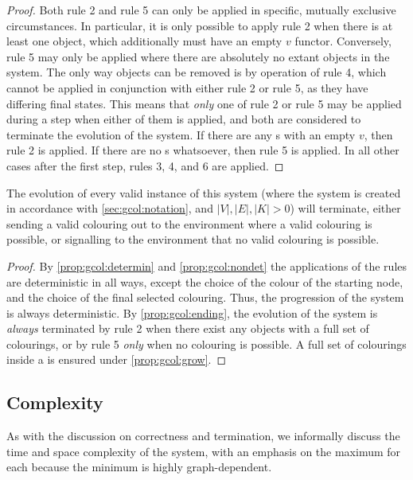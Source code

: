 \begin{proof}
Both rule 2 and rule 5 can only be applied in specific, mutually exclusive circumstances.  In particular, it is only possible to apply rule 2 when there is at least one \bo{} object, which additionally must have an empty \(v\) functor.  Conversely, rule 5 may only be applied where there are absolutely no extant \bo{} objects in the system.  The only way \bo{} objects can be removed is by operation of rule 4, which cannot be applied in conjunction with either rule 2 or rule 5, as they have differing final states.  This means that \emph{only} one of rule 2 or rule 5 may be applied during a step when either of them is applied, and both are considered to terminate the evolution of the system.  If there are any \bo{}s with an empty \(v\), then rule 2 is applied.  If there are no \bo{}s whatsoever, then rule 5 is applied.  In all other cases after the first step, rules 3, 4, and 6 are applied.
\end{proof}

\begin{theorem}
The evolution of every valid instance of this system (where the system is created in accordance with \cref{sec:gcol:notation}, and \(|V|, |E|, |K| > 0\)) will terminate, either sending a valid colouring out to the environment where a valid colouring is possible, or signalling to the environment that no valid colouring is possible.
\end{theorem}

\begin{proof}
By \cref{prop:gcol:determin} and \cref{prop:gcol:nondet} the applications of the rules are deterministic in all ways, except the choice of the colour of the starting node, and the choice of the final selected colouring.  Thus, the progression of the system is always deterministic.  By \cref{prop:gcol:ending}, the evolution of the system is \emph{always} terminated by rule 2 when there exist any \bo{} objects with a full set of colourings, or by rule 5 \emph{only} when no colouring is possible.  A full set of colourings inside a \bo{} is ensured under \cref{prop:gcol:grow}.
\end{proof}

\subsection{Complexity}
As with the discussion on correctness and termination, we informally discuss the time and space complexity of the system, with an emphasis on the maximum for each because the minimum is highly graph-dependent.

